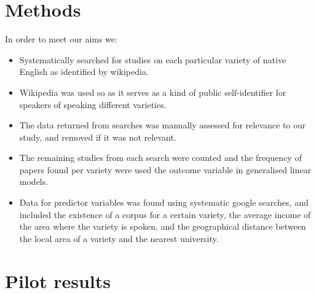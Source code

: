 \documentclass[a0paper,fleqn]{betterposter}
\begin{document}
{
	
\section{Methods}

In order to meet our aims we:
\begin{itemize}
	\item Systematically searched for studies on each particular variety of native English as identified by wikipedia.
	\item Wikipedia was used so as it serves as a kind of public self-identifier for speakers of speaking different varieties.
	\item The data returned from searches was manually assessed for relevance to our study, and removed if it was not relevant.
	\item The remaining studies from each search were counted and the frequency of papers found per variety were used the outcome variable in generalised linear models.
	\item Data for predictor variables was found using systematic google searches, and included the existence of a corpus for a certain variety, the average income of the area where the variety is spoken, and the geographical distance between the local area of a variety and the nearest university.

\end{itemize}



\section{Pilot results}



}
\end{document}
